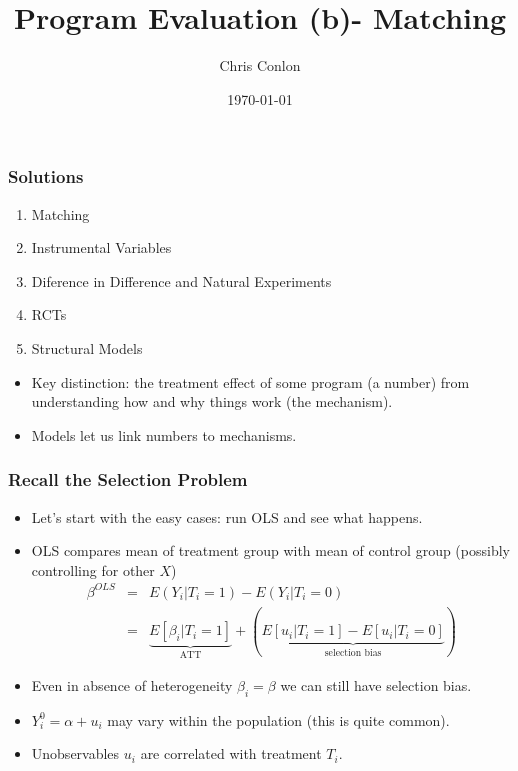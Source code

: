 \documentclass[xcolor=pdftex,dvipsnames,table,mathserif,aspectratio=169]{beamer}
\begin{document}
\title{Program Evaluation (b)- Matching}
\author{Chris Conlon}
\date{\today}

\frame{\titlepage}

\begin{frame}
\frametitle{Solutions}
\begin{enumerate}
\item \alert{Matching}
\item Instrumental Variables
\item Diference in Difference and Natural Experiments
\item RCTs
\item Structural Models
\end{enumerate}
\begin{itemize}
\item Key distinction: the treatment effect of some program (a number) from understanding how and why things work (the mechanism).
\item Models let us link numbers to mechanisms.
\end{itemize}
\end{frame}

\begin{frame}
\frametitle{Recall the Selection Problem}
\begin{itemize}
\item Let's start with the easy cases: run OLS and see what happens.
\item OLS compares mean of treatment group with mean of control group (possibly controlling for other $X$)
\begin{eqnarray*}
\beta^{OLS} &=& E(Y_i | T_i =1) - E(Y_i | T_i=0) \\
&=& \underbrace{E[\beta_i | T_i =1]}_{\mbox{ATT}} + \left(\underbrace{E[u_i | T_i =1 ] - E[u_i | T_i=0] }_{\mbox{selection bias}}  \right)
\end{eqnarray*}
\item Even in absence of heterogeneity $\beta_i = \beta$ we can still have selection bias. 
\item $Y_i^0 = \alpha + u_i$ may vary within the population (this is quite common).
\item \alert{Unobservables} $u_i$ are correlated with \alert{treatment} $T_i$.
\end{itemize}
\end{frame}
\end{document}
